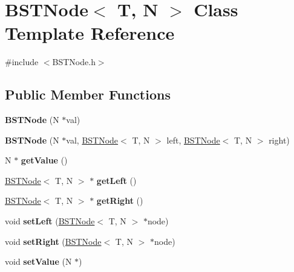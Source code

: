 \hypertarget{class_b_s_t_node}{}\section{B\+S\+T\+Node$<$ T, N $>$ Class Template Reference}
\label{class_b_s_t_node}


{\ttfamily \#include $<$B\+S\+T\+Node.\+h$>$}

\subsection*{Public Member Functions}
\begin{DoxyCompactItemize}
\item 
\mbox{\label{class_b_s_t_node_abf43af549af98d6454d6cab63278ecd7}} 
{\bfseries B\+S\+T\+Node} (N $\ast$val)
\item 
\mbox{\label{class_b_s_t_node_a8b3e29fac992d551b9f4085c87afeb4e}} 
{\bfseries B\+S\+T\+Node} (N $\ast$val, \hyperlink{class_b_s_t_node}{B\+S\+T\+Node}$<$ T, N $>$ left, \hyperlink{class_b_s_t_node}{B\+S\+T\+Node}$<$ T, N $>$ right)
\item 
\mbox{\label{class_b_s_t_node_a67f25f4cfd925f2d6a6715ec246601da}} 
N $\ast$ {\bfseries get\+Value} ()
\item 
\mbox{\label{class_b_s_t_node_ad05ca59e79b2b56b9f45249434fe72c0}} 
\hyperlink{class_b_s_t_node}{B\+S\+T\+Node}$<$ T, N $>$ $\ast$ {\bfseries get\+Left} ()
\item 
\mbox{\label{class_b_s_t_node_ab6f61ecaa4cef32f62f8194abaad4b52}} 
\hyperlink{class_b_s_t_node}{B\+S\+T\+Node}$<$ T, N $>$ $\ast$ {\bfseries get\+Right} ()
\item 
\mbox{\label{class_b_s_t_node_aaae2f112b6b2d93e3916dbeda8b65117}} 
void {\bfseries set\+Left} (\hyperlink{class_b_s_t_node}{B\+S\+T\+Node}$<$ T, N $>$ $\ast$node)
\item 
\mbox{\label{class_b_s_t_node_a95d68f8bf6ceb83137ac5206ca38c7e9}} 
void {\bfseries set\+Right} (\hyperlink{class_b_s_t_node}{B\+S\+T\+Node}$<$ T, N $>$ $\ast$node)
\item 
\mbox{\label{class_b_s_t_node_a93176c497f9ab7faf5b0580302e60c1a}} 
void {\bfseries set\+Value} (N $\ast$)
\end{DoxyCompactItemize}



